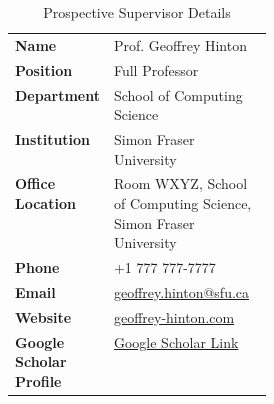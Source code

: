 \vspace{0.5cm}

\begin{table}[ht]
  \centering
  \begin{threeparttable}
    \renewcommand{\arraystretch}{1.3}
    \caption{Prospective Supervisor Details}
    \label{tbl:canadian-institution-intended-supervisor}
    \fontsize{9.5}{12}\selectfont
    \begin{tabularx}{0.65\textwidth}{
      >{\raggedright\arraybackslash}p{0.3\linewidth}
      >{\raggedright\arraybackslash}X
    }
    \toprule
    \cellcolor{myLightBlue}\textbf{Name} & Prof. Geoffrey Hinton \\ 
    \cellcolor{myLightBlue}\textbf{Position} & Full Professor \\ 
    \cellcolor{myLightBlue}\textbf{Department} & School of Computing Science \\ 
    \cellcolor{myLightBlue}\textbf{Institution} & Simon Fraser University \\ 
    \cellcolor{myLightBlue}\textbf{Office Location} & Room WXYZ, School of Computing Science, Simon Fraser University \\ 
    \cellcolor{myLightBlue}\textbf{Phone} & +1 777 777-7777 \\ 
    \cellcolor{myLightBlue}\textbf{Email} & \href{mailto:geoffrey.hinton@sfu.ca}{geoffrey.hinton@sfu.ca} \\ 
    \cellcolor{myLightBlue}\textbf{Website} & \href{https://geoffrey-hinton.com}{geoffrey-hinton.com} \\ 
    \cellcolor{myLightBlue}\textbf{Google Scholar Profile} & \href{https://scholar.google.com/}{Google Scholar Link} \\ \bottomrule
    \end{tabularx}
  \end{threeparttable}
  \vspace{0.5cm}
\end{table}

\clearpage
